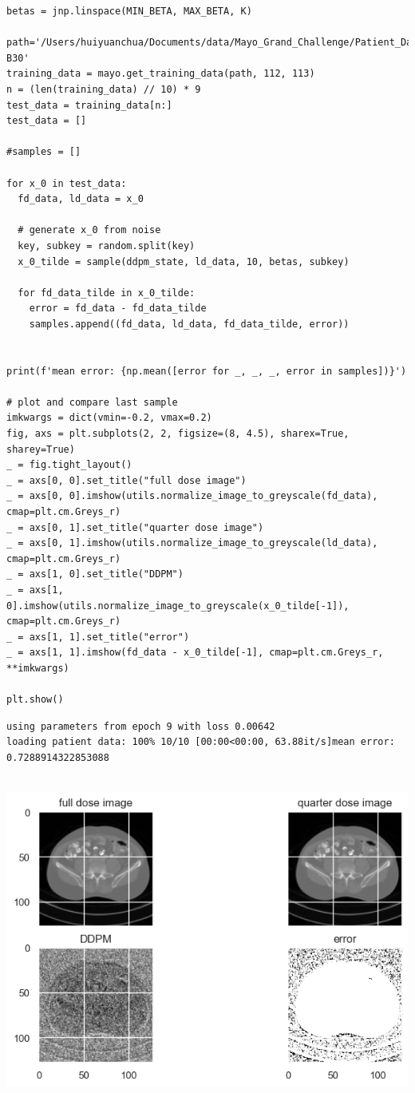 \documentclass[a4paper, 11pt]{article}
\begin{document}
\begin{verbatim}
betas = jnp.linspace(MIN_BETA, MAX_BETA, K)

path='/Users/huiyuanchua/Documents/data/Mayo_Grand_Challenge/Patient_Data/Training_Image_Data/3mm B30'
training_data = mayo.get_training_data(path, 112, 113)
n = (len(training_data) // 10) * 9
test_data = training_data[n:]
test_data = []

#samples = []

for x_0 in test_data:
  fd_data, ld_data = x_0

  # generate x_0 from noise
  key, subkey = random.split(key)
  x_0_tilde = sample(ddpm_state, ld_data, 10, betas, subkey)

  for fd_data_tilde in x_0_tilde:
    error = fd_data - fd_data_tilde
    samples.append((fd_data, ld_data, fd_data_tilde, error))


print(f'mean error: {np.mean([error for _, _, _, error in samples])}')

# plot and compare last sample
imkwargs = dict(vmin=-0.2, vmax=0.2)
fig, axs = plt.subplots(2, 2, figsize=(8, 4.5), sharex=True, sharey=True)
_ = fig.tight_layout()
_ = axs[0, 0].set_title("full dose image")
_ = axs[0, 0].imshow(utils.normalize_image_to_greyscale(fd_data), cmap=plt.cm.Greys_r)
_ = axs[0, 1].set_title("quarter dose image")
_ = axs[0, 1].imshow(utils.normalize_image_to_greyscale(ld_data), cmap=plt.cm.Greys_r)
_ = axs[1, 0].set_title("DDPM")
_ = axs[1, 0].imshow(utils.normalize_image_to_greyscale(x_0_tilde[-1]), cmap=plt.cm.Greys_r)
_ = axs[1, 1].set_title("error")
_ = axs[1, 1].imshow(fd_data - x_0_tilde[-1], cmap=plt.cm.Greys_r, **imkwargs)

plt.show()
\end{verbatim}

\begin{verbatim}
using parameters from epoch 9 with loss 0.00642
loading patient data: 100% 10/10 [00:00<00:00, 63.88it/s]mean error: 0.7288914322853088


\end{verbatim}

\begin{center}
\includegraphics[width=.9\linewidth]{./.ob-jupyter/0a34a41cd34492777e0170873512040d48cf0aa9.png}
\end{center}
\end{document}
